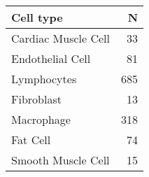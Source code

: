 \begin{table}[ht]
\centering
\begin{tabular}{lr}
  \hline
Cell type & N \\ 
  \hline
Cardiac Muscle Cell &  33 \\ 
  Endothelial Cell &  81 \\ 
  Lymphocytes & 685 \\ 
  Fibroblast &  13 \\ 
  Macrophage & 318 \\ 
  Fat Cell &  74 \\ 
  Smooth Muscle Cell &  15 \\ 
   \hline
\end{tabular}
\label{supp-tbl3}
\end{table}
